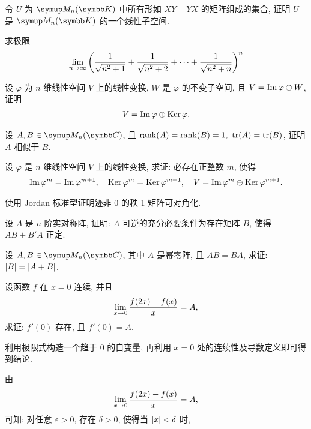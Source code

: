 \documentclass{ctexart}
\begin{document}
\begin{exercise}[series=exer]
\begin{exercise}
        \item 令 $ U $ 为 $ \MM[\K] $ 中所有形如 $ XY - YX $ 的矩阵组成的集合, 证明 $ U $ 是 $ \MM[\K] $ 的一个线性子空间. 
    \end{exercise}
    \item 求极限
    \begin{align*}
        \lim_{n \to \infty} \qty(\frac{1}{\sqrt{n^{2} + 1}} + \frac{1}{\sqrt{n^{2} + 2}} + \dots + \frac{1}{\sqrt{n^{2} + n}})^{n}
    \end{align*}
    \item 设 $ \varphi $ 为 $ n $ 维线性空间 $ V $ 上的线性变换, $ W $ 是 $ \varphi $ 的不变子空间, 且 $ V = \operatorname{Im} \varphi \oplus W $, 证明
    \begin{align*}
        V = \operatorname{Im} \varphi \oplus \operatorname{Ker} \varphi.
    \end{align*}
    \item 设 $ A, B \in \MM[\C] $, 且 $ \rank(A) = \rank(B)  = 1,\ \tr(A) = \tr(B) $, 证明 $ A $ 相似于 $ B $.
    \item 设 $ \varphi $ 是 $ n $ 维线性空间 $ V $ 上的线性变换, 求证: 必存在正整数 $ m $, 使得
    \begin{align*}
        \operatorname{Im} \varphi^{m} = \operatorname{Im} \varphi^{m+1},\quad \operatorname{Ker} \varphi^{m} = \operatorname{Ker} \varphi^{m+1}, \quad V = \operatorname{Im} \varphi^{m} \oplus \operatorname{Ker} \varphi^{m+1}.
    \end{align*}
    \item 使用 Jordan 标准型证明迹非 $ 0 $ 的秩 1 矩阵可对角化.
    \item 设 $ A $ 是 $ n $ 阶实对称阵, 证明: $ A $ 可逆的充分必要条件为存在矩阵 $ B $, 使得 $ AB + B'A $ 正定.
    \item 设 $ A, B \in \MM[\C] $, 其中 $ A $ 是幂零阵, 且 $ AB = BA $, 求证: $ \abs{B} = \abs{A + B} $. 
    \item 设函数 $ f $ 在 $ x = 0 $ 连续, 并且
    \begin{align*}
        \lim_{x \to 0}\frac{f(2x) - f(x)}{x} = A,
    \end{align*}
    求证: $ f'(0) $ 存在, 且 $ f'(0) = A $. 
    \begin{hint}
        利用极限式构造一个趋于 $ 0 $ 的自变量, 再利用 $ x = 0 $ 处的连续性及导数定义即可得到结论.
    \end{hint}
    \begin{answer}
        由
        \begin{align*}
            \lim_{x \to 0}\frac{f(2x) - f(x)}{x} = A,
        \end{align*}
        可知: 对任意 $ \varepsilon > 0 $, 存在 $ \delta > 0 $, 使得当 $ \abs{x} < \delta $ 时, 

\end{answer}
\end{exercise}
\end{document}

